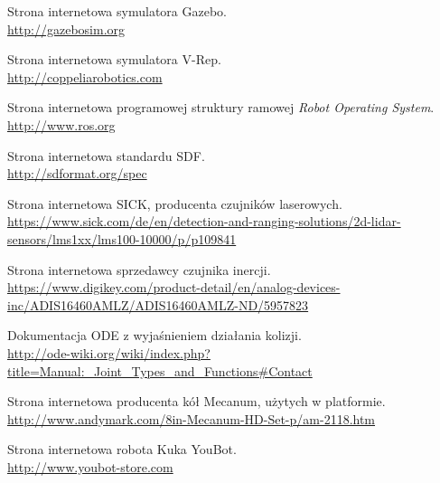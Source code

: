 \begin{thebibliography}{0}
Strona internetowa symulatora Gazebo. \\
\url{http://gazebosim.org}

Strona internetowa symulatora V-Rep. \\
\url{http://coppeliarobotics.com}

Strona internetowa programowej struktury ramowej \emph{Robot Operating System}. \\
\url{http://www.ros.org}

Strona internetowa standardu SDF. \\
\url{http://sdformat.org/spec}

Strona internetowa SICK, producenta czujników laserowych. \\
\url{https://www.sick.com/de/en/detection-and-ranging-solutions/2d-lidar-sensors/lms1xx/lms100-10000/p/p109841}

Strona internetowa sprzedawcy czujnika inercji. \\
\url{https://www.digikey.com/product-detail/en/analog-devices-inc/ADIS16460AMLZ/ADIS16460AMLZ-ND/5957823}

Dokumentacja ODE z wyjaśnieniem działania kolizji. \\
\url{http://ode-wiki.org/wiki/index.php?title=Manual:_Joint_Types_and_Functions#Contact}

Strona internetowa producenta kół Mecanum, użytych w platformie. \\
\url{http://www.andymark.com/8in-Mecanum-HD-Set-p/am-2118.htm}

Strona internetowa robota Kuka YouBot. \\
\url{http://www.youbot-store.com}

\end{thebibliography}

